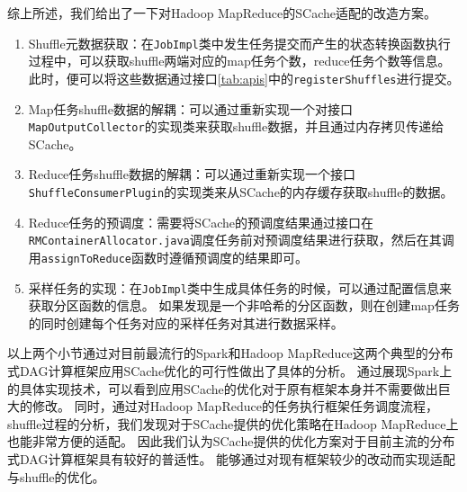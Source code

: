 综上所述，我们给出了一下对Hadoop MapReduce的SCache适配的改造方案。
\begin{enumerate}
    \item Shuffle元数据获取：在\verb|JobImpl|类中发生任务提交而产生的状态转换函数执行过程中，可以获取shuffle两端对应的map任务个数，reduce任务个数等信息。
    此时，便可以将这些数据通过接口\ref{tab:apis}中的\verb|registerShuffles|进行提交。
    \item Map任务shuffle数据的解耦：可以通过重新实现一个对接口\verb|MapOutputCollector|的实现类来获取shuffle数据，并且通过内存拷贝传递给SCache。
    \item Reduce任务shuffle数据的解耦：可以通过重新实现一个接口\verb|ShuffleConsumerPlugin|的实现类来从SCache的内存缓存获取shuffle的数据。
    \item Reduce任务的预调度：需要将SCache的预调度结果通过接口在\verb|RMContainerAllocator.java|调度任务前对预调度结果进行获取，然后在其调用\verb|assignToReduce|函数时遵循预调度的结果即可。
    \item 采样任务的实现：在\verb|JobImpl|类中生成具体任务的时候，可以通过配置信息来获取分区函数的信息。
    如果发现是一个非哈希的分区函数，则在创建map任务的同时创建每个任务对应的采样任务对其进行数据采样。
\end{enumerate}

以上两个小节通过对目前最流行的Spark和Hadoop MapReduce这两个典型的分布式DAG计算框架应用SCache优化的可行性做出了具体的分析。
通过展现Spark上的具体实现技术，可以看到应用SCache的优化对于原有框架本身并不需要做出巨大的修改。
同时，通过对Hadoop MapReduce的任务执行框架任务调度流程，shuffle过程的分析，我们发现对于SCache提供的优化策略在Hadoop MapReduce上也能非常方便的适配。
因此我们认为SCache提供的优化方案对于目前主流的分布式DAG计算框架具有较好的普适性。
能够通过对现有框架较少的改动而实现适配与shuffle的优化。
